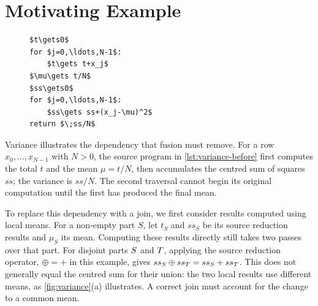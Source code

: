 \begingroup
\setlength{\intextsep}{2pt}
\captionsetup[lstlisting]{justification=raggedright,singlelinecheck=false}
\section{Motivating Example}
\label{sec:example}

\begin{figure}
\begin{lstlisting}[style=pseudocode,caption={Two-pass source program.},label={lst:variance-before}]
$t\gets0$
for $j=0,\ldots,N-1$:
    $t\gets t+x_j$
$\mu\gets t/N$
$ss\gets0$
for $j=0,\ldots,N-1$:
    $ss\gets ss+(x_j-\mu)^2$
return $\;ss/N$
\end{lstlisting}
\end{figure}
Variance illustrates the dependency that fusion must remove.
For a row $x_0,\ldots,x_{N-1}$ with $N>0$, the source program in \cref{lst:variance-before} first computes the total $t$ and the mean $\mu=t/N$, then accumulates the centred sum of squares $ss$; the variance is $ss/N$.
The second traversal cannot begin its original computation until the first has produced the final mean.

To replace this dependency with a join, we first consider results computed using local means.
For a non-empty part $S$, let $t_S$ and $ss_S$ be its source reduction results and $\mu_S$ its mean.
Computing these results directly still takes two passes over that part.
For disjoint parts $S$ and $T$, applying the source reduction operator, $\oplus=+$ in this example, gives $ss_S\oplus ss_T=ss_S+ss_T$.
This does not generally equal the centred sum for their union: the two local results use different means, as \cref{fig:variance}(a) illustrates.
A correct join must account for the change to a common mean.

